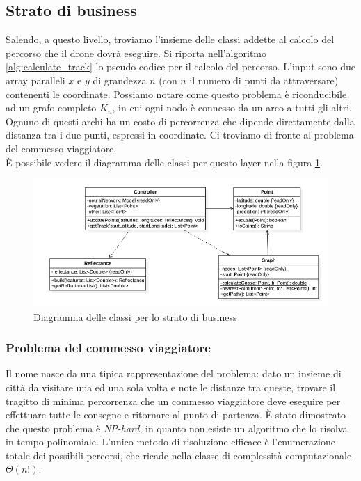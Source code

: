 \subsection{Strato di business}
Salendo, a questo livello, troviamo l'insieme delle classi addette al calcolo del percorso che il drone dovrà eseguire. Si riporta nell'algoritmo \ref{alg:calculate_track} lo pseudo-codice per il calcolo del percorso. L'input sono due array paralleli $x$ e $y$ di grandezza $n$ (con $n$ il numero di punti da attraversare) contenenti le coordinate. Possiamo notare come questo problema è riconducibile ad un grafo completo $K_n$, in cui ogni nodo è connesso da un arco a tutti gli altri. Ognuno di questi archi ha un costo di percorrenza che dipende direttamente dalla distanza tra i due punti, espressi in coordinate. Ci troviamo di fronte al problema del commesso viaggiatore.\\
È possibile vedere il diagramma delle classi per questo layer nella figura \ref{fig:class_diagram_business}.

\begin{figure}
    \centering
    \includegraphics[width=\textwidth]{immagini/business_classes.png}
    \caption{Diagramma delle classi per lo strato di business}
    \label{fig:class_diagram_business}
\end{figure}

\subsubsection{Problema del commesso viaggiatore}
Il nome nasce da una tipica rappresentazione del problema: dato un insieme di città da visitare una ed una sola volta e note le distanze tra queste, trovare il tragitto di minima percorrenza che un commesso viaggiatore deve eseguire per effettuare tutte le consegne e ritornare al punto di partenza. È stato dimostrato che questo problema è \textit{NP-hard}, in quanto non esiste un algoritmo che lo risolva in tempo polinomiale. L'unico metodo di risoluzione efficace è l'enumerazione totale dei possibili percorsi, che ricade nella classe di complessità computazionale $\Theta(n!)$.

